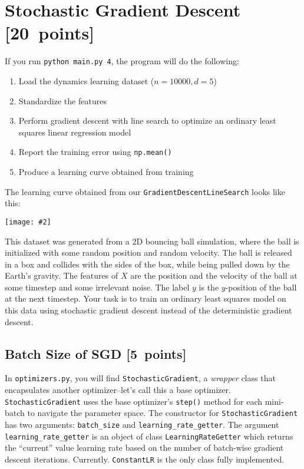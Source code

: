 \documentclass{article}
\newcommand\pts[1]{\textcolor{pointscolour}{[#1~points]}}
\newcommand{\centerfig}[2]{\begin{center}\texttt{[image: \#2]}\end{center}}
\begin{document}
\clearpage
\section{Stochastic Gradient Descent \pts{20}}

If you run \verb|python main.py 4|, the program will do the following:
\begin{enumerate}
	\item Load the dynamics learning dataset ($n = 10000, d = 5$)
	\item Standardize the features
	\item Perform gradient descent with line search to optimize an ordinary least squares linear regression model
	\item Report the training error using \texttt{np.mean()}
	\item Produce a learning curve obtained from training
\end{enumerate}

The learning curve obtained from our \texttt{GradientDescentLineSearch} looks like this:
\centerfig{.6}{./figs/gd_line_search_curve.png}

This dataset was generated from a 2D bouncing ball simulation, where the ball is initialized with some random position and random velocity. The ball is released in a box and collides with the sides of the box, while being pulled down by the Earth's gravity. The features of $X$ are the position and the velocity of the ball at some timestep and some irrelevant noise. The label $y$ is the $y$-position of the ball at the next timestep. Your task is to train an ordinary least squares model on this data using stochastic gradient descent instead of the deterministic gradient descent.

\subsection{Batch Size of SGD \pts{5}}

In \texttt{optimizers.py}, you will find \texttt{StochasticGradient}, a \textit{wrapper} class that encapsulates another optimizer--let's call this a base optimizer.
\texttt{StochasticGradient} uses the base optimizer's \texttt{step()} method for each mini-batch to navigate the parameter space.
The constructor for \texttt{StochasticGradient} has two arguments: \texttt{batch\_size} and \texttt{learning\_rate\_getter}. The argument \texttt{learning\_rate\_getter} is an object of class \texttt{LearningRateGetter} which returns the ``current'' value learning rate based on the number of batch-wise gradient descent iterations. Currently. \texttt{ConstantLR} is the only class fully implemented.
\end{document}

